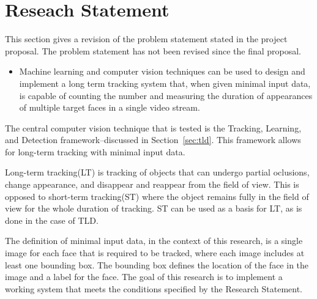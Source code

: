 \section{Reseach Statement}
  This section gives a revision of the problem statement stated in the project proposal.
  The problem statement has not been revised since the final proposal.
  \begin{itemize}
    \item
    Machine learning and computer vision techniques can be used to design and implement a long term tracking system that, when given minimal input data, is capable of counting the number and measuring the duration of appearances of multiple target faces in a single video stream.
  \end{itemize}

  The central computer vision technique that is tested is the Tracking, Learning, and Detection framework--discussed in Section~\ref{sec:tld}.
  This framework allows for long-term tracking with minimal input data. 
  
  Long-term tracking(LT) is tracking of objects that can undergo partial oclusions, change appearance, and disappear and reappear from the field of view.
  This is opposed to short-term tracking(ST) where the object remains fully in the field of view for the whole duration of tracking.
  ST can be used as a basis for LT, as is done in the case of TLD.

  The definition of minimal input data, in the context of this research, is a single image for each face that is required to be tracked, where each image includes at least one bounding box.
  The bounding box defines the location of the face in the image and a label for the face.
  The goal of this research is to implement a working system that meets the conditions specified by the Research Statement.
